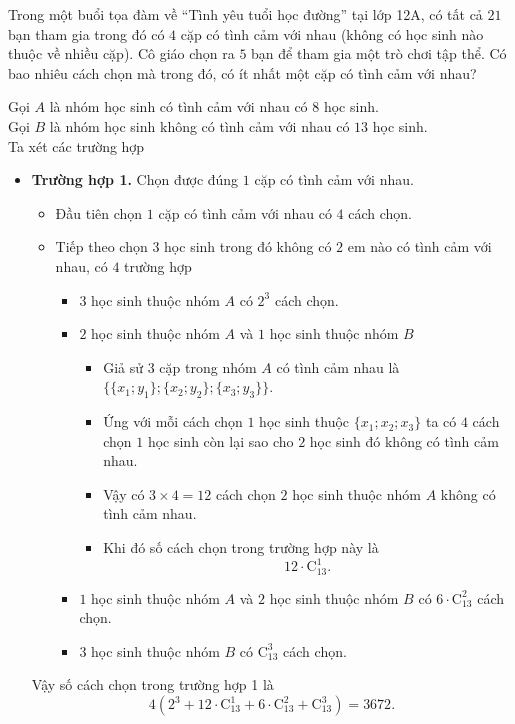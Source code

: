 \begin{bt}%
	Trong một buổi tọa đàm về ``Tình yêu tuổi học đường'' tại lớp 12A, có tất cả $21$ bạn tham gia trong đó có $4$ cặp có tình cảm với nhau (không có học sinh nào thuộc về nhiều cặp). Cô giáo chọn ra $5$ bạn để tham gia một trò chơi tập thể. Có bao nhiêu cách chọn mà trong đó, có ít nhất một cặp có tình cảm với nhau?
	\loigiai
	{
		Gọi $A$ là nhóm học sinh có tình cảm với nhau có $8$ học sinh.\\
		Gọi $B$ là nhóm học sinh không có tình cảm với nhau có $13$ học sinh.\\
		Ta xét các trường hợp
		\begin{itemize}
			\item \textbf{Trường hợp 1.} Chọn được đúng $1$ cặp có tình cảm với nhau.
			\begin{itemize}
				\item Đầu tiên chọn $1$ cặp có tình cảm với nhau có $4$ cách chọn.
				\item Tiếp theo chọn $3$ học sinh trong đó không có $2$ em nào có tình cảm với nhau, có $4$ trường hợp
				\begin{itemize}
					\item $3$ học sinh thuộc nhóm $A$ có $2^3$ cách chọn.
					\item $2$ học sinh thuộc nhóm $A$ và $1$ học sinh thuộc nhóm $B$
					\begin{itemize}
						\item Giả sử $3$ cặp trong nhóm $A$ có tình cảm nhau là $\{\{x_1;y_1\};\{x_2;y_2\};\{x_3;y_3\}\}$.
						\item Ứng với mỗi cách chọn $1$ học sinh thuộc $\{x_1;x_2;x_3\}$ ta có $4$ cách chọn $1$ học sinh còn lại sao cho $2$ học sinh đó không có tình cảm nhau.
						\item Vậy có $3\times4=12$ cách chọn $2$ học sinh thuộc nhóm $A$ không có tình cảm nhau.
						\item Khi đó số cách chọn trong trường hợp này là \[12\cdot\mathrm{C}_{13}^1.\]
					\end{itemize}
					\item $1$ học sinh thuộc nhóm $A$ và $2$ học sinh thuộc nhóm $B$ có $6\cdot\mathrm{C}_{13}^2$ cách chọn.
					\item $3$ học sinh thuộc nhóm $B$ có $\mathrm{C}_{13}^3$ cách chọn.
				\end{itemize}
			\end{itemize}
		Vậy số cách chọn trong trường hợp 1 là \[4(2^3+12\cdot\mathrm{C}_{13}^1+6\cdot\mathrm{C}_{13}^2+\mathrm{C}_{13}^3)=3672.\]

\end{itemize}}
\end{bt}
